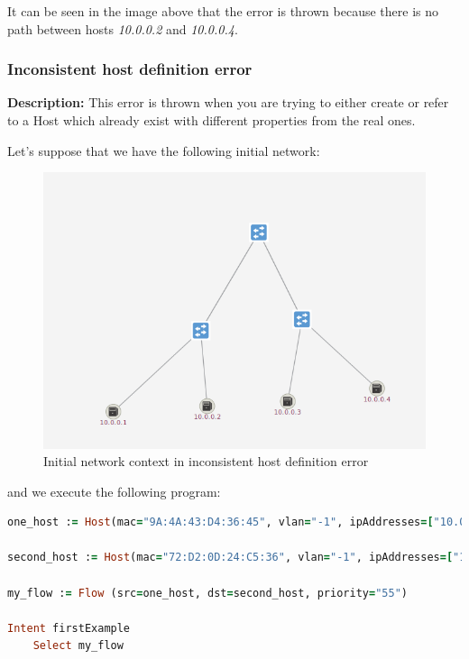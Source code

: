 It can be seen in the image above that the error is thrown because there is no path between hosts \textit{10.0.0.2} and \textit{10.0.0.4}. 

\subsubsection{Inconsistent host definition error}

\textbf{Description:} This error is thrown when you are trying to either create or refer to a Host which already exist with different properties from the real ones. 

Let's suppose that we have the following initial network:

\begin{figure}[H]
\centering
\includegraphics[width=\textwidth]{images/haikunet/error_scenario_3.png}
\caption{Initial network context in inconsistent host definition error}
\end{figure}

and we execute the following program:

\begin{lstlisting}[language=Ruby,breaklines=true]
one_host := Host(mac="9A:4A:43:D4:36:45", vlan="-1", ipAddresses=["10.0.0.1"], elementId="of:0000000000000002", port="1")

second_host := Host(mac="72:D2:0D:24:C5:36", vlan="-1", ipAddresses=["10.0.0.4"], elementId="of:0000000000000003", port="2")

my_flow := Flow (src=one_host, dst=second_host, priority="55")

Intent firstExample
    Select my_flow
\end{lstlisting}


